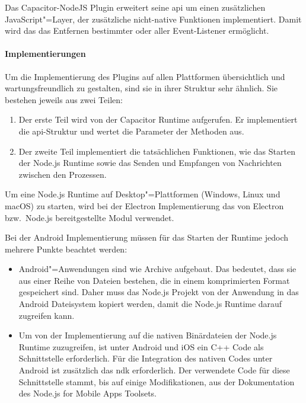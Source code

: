 Das Capacitor-NodeJS Plugin erweitert seine \ac{api} um einen zusätzlichen JavaScript"=Layer, der zusätzliche nicht-native Funktionen implementiert.
Damit wird das das Entfernen bestimmter oder aller Event-Listener ermöglicht.

\paragraph{Implementierungen}

Um die Implementierung des Plugins auf allen Plattformen übersichtlich und wartungsfreundlich zu gestalten, sind sie in ihrer Struktur sehr ähnlich.
Sie bestehen jeweils aus zwei Teilen:

\begin{enumerate}
  \item 
  Der erste Teil wird von der Capacitor Runtime aufgerufen.
  Er implementiert die \acs{api}-Struktur und wertet die Parameter der Methoden aus.
  \item 
  Der zweite Teil implementiert die tatsächlichen Funktionen,
  wie das Starten der Node.js Runtime sowie das Senden und Empfangen von Nachrichten zwischen den Prozessen.
\end{enumerate}

Um eine Node.js Runtime auf Desktop"=Plattformen (Windows, Linux und macOS) zu starten, wird bei der Electron Implementierung das von Electron bzw.\ Node.js bereitgestellte Modul  verwendet.
\cite{electron:docs}

Bei der Android Implementierung müssen für das Starten der Runtime jedoch mehrere Punkte beachtet werden:

\begin{itemize}
  \item
  Android"=Anwendungen sind wie Archive aufgebaut.
  Das bedeutet, dass sie aus einer Reihe von Dateien bestehen, die in einem komprimierten Format gespeichert sind.
  Daher muss das Node.js Projekt von der Anwendung in das Android Dateisystem kopiert werden, damit die Node.js Runtime darauf zugreifen kann.
  \cite{nodejs-mobile:docs}

  \item 
  Um von der Implementierung auf die nativen Binärdateien der Node.js Runtime zuzugreifen, ist unter Android und iOS ein C++ Code als Schnittstelle erforderlich.
  Für die Integration des nativen Codes unter Android ist zusätzlich das \ac{ndk} erforderlich.
  Der verwendete Code für diese Schnittstelle stammt, bis auf einige Modifikationen, aus der Dokumentation des Node.js for Mobile Apps Toolsets.
  \cite{nodejs-mobile:docs}
\end{itemize}

